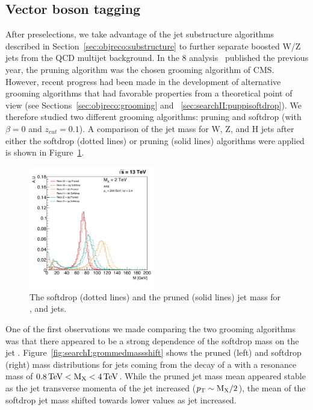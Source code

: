 \subsection{Vector boson tagging}
\label{sec:searchI:wtagging}
After preselections, we take advantage of the jet substructure algorithms described in Section~\ref{sec:objreco:substructure} to further separate boosted W/Z jets from the QCD multijet background. In the 8 \TeV analysis~\cite{Khachatryan:1700394} published the previous year, the pruning algorithm was the chosen grooming algorithm of CMS. However, recent progress had been made in the development of alternative grooming algorithms that had favorable properties from a theoretical point of view (see Sections~\ref{sec:objreco:grooming} and ~\ref{sec:searchII:puppisoftdrop}). We therefore studied two different grooming algorithms: pruning and softdrop (with $\beta=0$ and $z_{cut} = 0.1$). A comparison of the jet mass for W, Z, and H jets after either the softdrop (dotted lines) or pruning (solid lines) algorithms were applied is shown in Figure~\ref{fig:searchI:sdvspruning}.
 \begin{figure}[h!]
 \centering
 \includegraphics[width=0.49\textwidth]{figures/analysis/search1/misc/SDvsPruned.pdf}
 \caption{The softdrop (dotted lines) and the pruned (solid lines) jet mass for \PW, \PZ and \PH jets.}
 \label{fig:searchI:sdvspruning}
 \end{figure}
One of the first observations we made comparing the two grooming algorithms was that there appeared to be a strong dependence of the softdrop mass on the jet \PT. Figure~\ref{fig:searchI:grommedmassshift} shows the pruned (left) and softdrop (right) mass distributions for \PW jets coming from the decay of a \BulkG with a resonance mass of $0.8 \,\text{Te\hspace{-.08em}V} < \text{M}_{\text{X}} < 4 \,\text{Te\hspace{-.08em}V}$. While the pruned jet mass mean appeared stable as the jet transverse momenta of the jet increased ($p_{\mathrm{T}}\sim\text{M}_{\text{X}}/2$), the mean of the softdrop jet mass shifted towards lower values as jet \PT increased.
